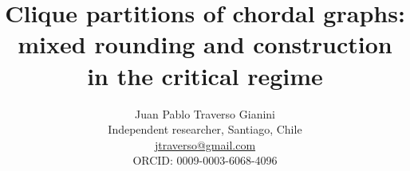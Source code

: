 \documentclass[english,11pt,a4paper]{article}
\title{Clique partitions of chordal graphs:\\mixed rounding and construction in the critical regime}
\author{Juan Pablo Traverso Gianini\\
\small Independent researcher, Santiago, Chile\\
\small \href{mailto:jtraverso@gmail.com}{jtraverso@gmail.com}\\
\small ORCID: 0009-0003-6068-4096}
\date{}
\begin{document}
\raggedbottom
\maketitle
\end{document}
